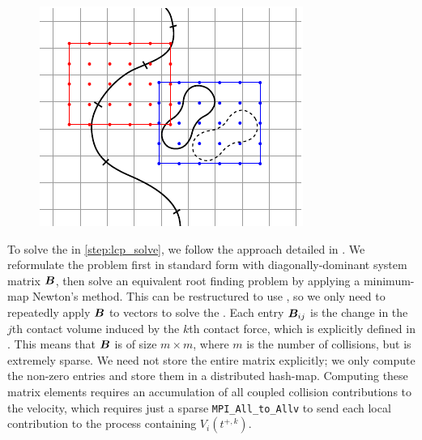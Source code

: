 \begin{figure}[h]
\centering
\begin{minipage}[b]{0.8\textwidth}
    \centering
    \includegraphics[angle=0,width=.7\linewidth]{figs/grid_and_check_points.pdf}
\end{minipage}
\end{figure}%
To solve the \lcp in \cref{step:lcp_solve}, we follow the approach
detailed in \cite[Section 3.2.2, Section 3.3]{lu2017}. 
We reformulate the problem first in standard \lcp form with diagonally-dominant system matrix $\bm{B}$, then 
solve an equivalent root finding problem by applying a minimum-map Newton's
method. This can be restructured to use \gmres, so we only need to repeatedly apply  
$\bm{B}$ to vectors to solve the \lcp.
Each entry $\bm{B}_{ij}$ is the change in the $j$th contact volume induced by the
$k$th contact force, which is explicitly defined in
\cite[Algorithm 3]{lu2018parallel}.
This means that $\bm{B}$ is of size $m \times m$, where $m$ is the number of
collisions, but is extremely sparse.
We need not store the entire matrix explicitly; we only compute the non-zero entries and
store them in a distributed hash-map.
Computing these matrix elements requires an accumulation of all coupled
collision contributions to the velocity, which requires just a sparse
\texttt{MPI\_All\_to\_Allv} to send each local contribution to the process containing
$V_i(t^{+,k})$.

